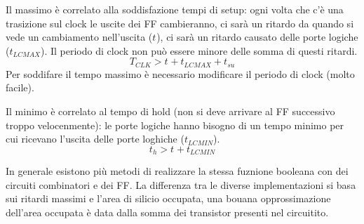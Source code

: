 \documentclass[12pt]{article}
\begin{document}
Il massimo \`e correlato alla soddisfazione tempi di setup: ogni volta che c'\`e una trasizione sul clock le uscite dei FF cambieranno, ci sar\`a un ritardo da quando si vede un cambiamento nell'uscita ($t_{}$), ci sar\`a un ritardo causato delle porte logiche ($t_{LCMAX}$). Il periodo di clock non pu\`o essere minore delle somma di questi ritardi.
\[ T_{CLK} > t_{} + t_{LCMAX} + t_{su} \]
Per soddifare il tempo massimo \`e necessario modificare il periodo di clock (molto facile).

Il minimo \`e correlato al tempo di hold (non si deve arrivare al FF successivo troppo velocenmente): le porte logiche hanno bisogno di un tempo minimo per cui ricevano l'uscita delle porte loghiche ($t_{LCMIN}$).
\[ t_h > t_{} + t_{LCMIN} \]

In generale esistono pi\`u metodi di realizzare la stessa fuznione booleana con dei circuiti combinatori e dei FF. La differenza tra le diverse implementazioni si basa sui ritardi massimi e l'area di silicio occupata, una bouana opprossimazione dell'area occupata \`e data dalla somma dei transistor presenti nel circuitito. 
\end{document}
